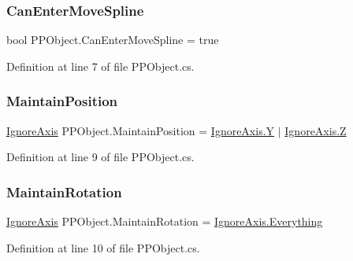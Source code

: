 \subsubsection{\texorpdfstring{Can\+Enter\+Move\+Spline}{CanEnterMoveSpline}}
{\footnotesize\ttfamily bool P\+P\+Object.\+Can\+Enter\+Move\+Spline = true}



Definition at line 7 of file P\+P\+Object.\+cs.

\mbox{\label{class_p_p_object_ad6ffb2bd4353f3ebf44561da0fb9f352}} 
\subsubsection{\texorpdfstring{Maintain\+Position}{MaintainPosition}}
{\footnotesize\ttfamily \mbox{\hyperlink{_ignore_axis_8cs_aa61b0141055d583a4f5b013297a1d48f}{Ignore\+Axis}} P\+P\+Object.\+Maintain\+Position = \mbox{\hyperlink{_ignore_axis_8cs_aa61b0141055d583a4f5b013297a1d48fa57cec4137b614c87cb4e24a3d003a3e0}{Ignore\+Axis.\+Y}} $\vert$ \mbox{\hyperlink{_ignore_axis_8cs_aa61b0141055d583a4f5b013297a1d48fa21c2e59531c8710156d34a3c30ac81d5}{Ignore\+Axis.\+Z}}}



Definition at line 9 of file P\+P\+Object.\+cs.

\mbox{\label{class_p_p_object_a5b0142f71e2f406feabe00f1fb17f062}} 
\subsubsection{\texorpdfstring{Maintain\+Rotation}{MaintainRotation}}
{\footnotesize\ttfamily \mbox{\hyperlink{_ignore_axis_8cs_aa61b0141055d583a4f5b013297a1d48f}{Ignore\+Axis}} P\+P\+Object.\+Maintain\+Rotation = \mbox{\hyperlink{_ignore_axis_8cs_aa61b0141055d583a4f5b013297a1d48fa709468af25e91284821d1bdbfdded24c}{Ignore\+Axis.\+Everything}}}



Definition at line 10 of file P\+P\+Object.\+cs.

\mbox{\label{class_p_p_object_a980e154549866d63adac0ab449fac07e}} 
